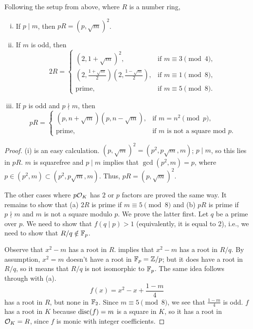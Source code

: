 \begin{theorem} \label{thm:quadratic_number_field_factorization}
    Following the setup from above, where $R$ is a number ring,
    \begin{enumerate}[(i)]
        \item If $p \mid m$, then $p R = (p, \sqrt{m})^2$.
        \item If $m$ is odd, then
        \[ 2R = \begin{cases} (2, 1 + \sqrt m)^2, & \text{if $m \equiv 3 \pmod{4}$}, \\ \left(2, \frac{1 + \sqrt{m}}{2}\right)\left(2, \frac{1 - \sqrt{m}}{2}\right), & \text{if $m \equiv 1 \pmod 8$}, \\ \text{prime}, & \text{if $m \equiv 5 \pmod{8}$.} \end{cases} \]
        \item If $p$ is odd and $p \nmid m$, then
        \[ pR = \begin{cases} (p, n + \sqrt m)(p, n - \sqrt m), & \text{if $m = n^2 \pmod{p}$}, \\ \text{prime}, & \text{if $m$ is not a square mod $p$.} \end{cases} \]
    \end{enumerate}
\end{theorem}

\newpage
\begin{proof}
    (i) is an easy calculation. $(p, \sqrt{m})^2 = (p^2, p \sqrt{m}, m)$; $p \mid m$, so this lies in $p R$. $m$ is squarefree and $p \mid m$ implies that $\gcd(p^2, m) = p$, where $p \in (p^2, m) \subset (p^2, p \sqrt m, m)$. Thus, $pR = (p, \sqrt m)^2$.

    The other cases where $p \mathcal O_K$ has $2$ or $p$ factors are proved the same way. It remains to show that (a) $2R$ is prime if $m \equiv 5 \pmod{8}$ and (b) $pR$ is prime if $p \nmid m$ and $m $ is not a square modulo $p$. We prove the latter first. Let $q$ be a prime over $p$. We need to show that $f(q \mid p) > 1$ (equivalently, it is equal to $2$), i.e., we need to show that $R/q \notin \mathbb F_p$.

    Observe that $x^2 - m$ has a root in $R$. implies that $x^2 - m$ has a root in $R/q$. By assumption, $x^2 = m$ doesn't have a root in $\mathbb F_p = \mathbb Z/p$; but it does have a root in $R/q$, so it means that $R/q$ is not isomorphic to $\mathbb F_p$. The same idea follows through with (a).
    \[ f(x) = x^2 - x + \frac{1 - m}{4} \]
    has a root in $R$, but none in $\mathbb F_2$. Since $m \equiv 5 \pmod{8}$, we see that $\frac{1-m}{4}$ is odd. $f$ has a root in $K$ because $\operatorname{disc}(f) = m$ is a square in $K$, so it has a root in $\mathcal O_K = R$, since $f$ is monic with integer coefficients.
\end{proof}

